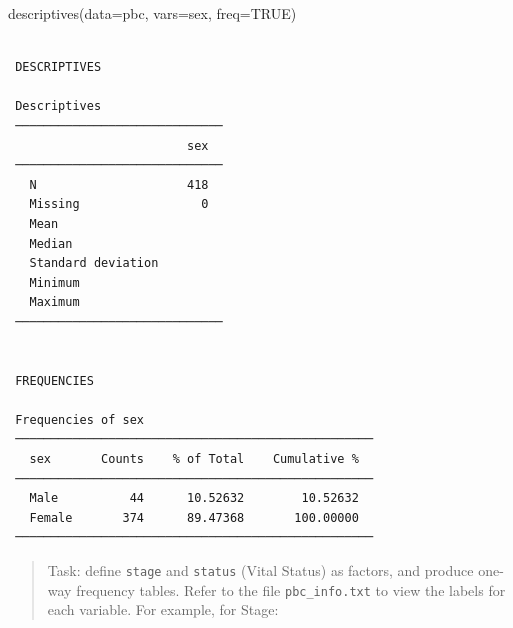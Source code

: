 \documentclass[
  a4paper,
]{memoir}
\newenvironment{Shaded}{\begin{snugshade}}{\end{snugshade}}
\newcommand{\AttributeTok}[1]{\textcolor[rgb]{0.00,0.00,0.00}{#1}}
\newcommand{\ConstantTok}[1]{\textcolor[rgb]{0.00,0.00,0.00}{#1}}
\newcommand{\DecValTok}[1]{\textcolor[rgb]{0.00,0.00,0.00}{#1}}
\newcommand{\FunctionTok}[1]{\textcolor[rgb]{0.00,0.00,0.00}{#1}}
\newcommand{\NormalTok}[1]{\textcolor[rgb]{0.00,0.00,0.00}{#1}}
\newcommand{\OtherTok}[1]{\textcolor[rgb]{0.00,0.00,0.00}{#1}}
\newcommand{\SpecialCharTok}[1]{\textcolor[rgb]{0.00,0.00,0.00}{#1}}
\newcommand{\StringTok}[1]{\textcolor[rgb]{0.00,0.00,0.00}{#1}}
\begin{document}
\begin{Shaded}
\begin{Highlighting}[]
\FunctionTok{descriptives}\NormalTok{(}\AttributeTok{data=}\NormalTok{pbc, }\AttributeTok{vars=}\NormalTok{sex, }\AttributeTok{freq=}\ConstantTok{TRUE}\NormalTok{)}
\end{Highlighting}
\end{Shaded}

\begin{verbatim}

 DESCRIPTIVES

 Descriptives                  
 ───────────────────────────── 
                         sex   
 ───────────────────────────── 
   N                     418   
   Missing                 0   
   Mean                        
   Median                      
   Standard deviation          
   Minimum                     
   Maximum                     
 ───────────────────────────── 


 FREQUENCIES

 Frequencies of sex                                 
 ────────────────────────────────────────────────── 
   sex       Counts    % of Total    Cumulative %   
 ────────────────────────────────────────────────── 
   Male          44      10.52632        10.52632   
   Female       374      89.47368       100.00000   
 ────────────────────────────────────────────────── 
\end{verbatim}

\begin{quote}
Task: define \texttt{stage} and \texttt{status} (Vital Status) as
factors, and produce one-way frequency tables. Refer to the file
\texttt{pbc\_info.txt} to view the labels for each variable. For
example, for Stage:
\end{quote}

\begin{Shaded}
\end{Shaded}
\end{document}
